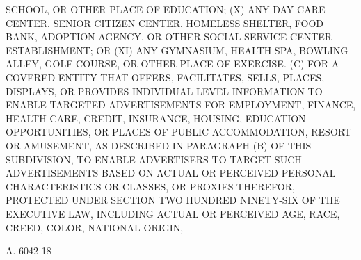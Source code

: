  SCHOOL, OR OTHER PLACE OF EDUCATION;
   (X) ANY DAY CARE CENTER, SENIOR CITIZEN CENTER, HOMELESS SHELTER, FOOD
 BANK, ADOPTION AGENCY, OR OTHER SOCIAL SERVICE CENTER ESTABLISHMENT; OR
   (XI)  ANY  GYMNASIUM, HEALTH SPA, BOWLING ALLEY, GOLF COURSE, OR OTHER
 PLACE OF EXERCISE.
   (C) FOR A COVERED ENTITY  THAT  OFFERS,  FACILITATES,  SELLS,  PLACES,
 DISPLAYS,  OR  PROVIDES  INDIVIDUAL LEVEL INFORMATION TO ENABLE TARGETED
 ADVERTISEMENTS FOR EMPLOYMENT, FINANCE, HEALTH CARE, CREDIT,  INSURANCE,
 HOUSING,  EDUCATION  OPPORTUNITIES,  OR  PLACES OF PUBLIC ACCOMMODATION,
 RESORT OR AMUSEMENT, AS DESCRIBED IN PARAGRAPH (B) OF THIS  SUBDIVISION,
 TO  ENABLE  ADVERTISERS TO TARGET SUCH ADVERTISEMENTS BASED ON ACTUAL OR
 PERCEIVED PERSONAL CHARACTERISTICS  OR  CLASSES,  OR  PROXIES  THEREFOR,
 PROTECTED  UNDER  SECTION  TWO  HUNDRED NINETY-SIX OF THE EXECUTIVE LAW,
 INCLUDING ACTUAL OR PERCEIVED AGE, RACE, CREED, COLOR, NATIONAL  ORIGIN,

 A. 6042                            18


